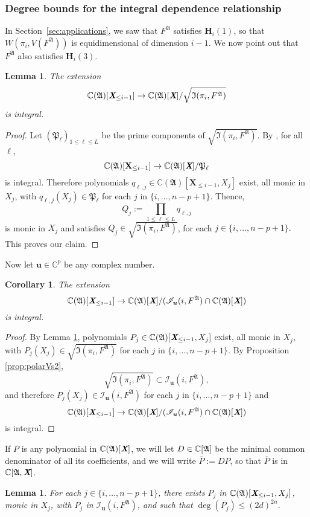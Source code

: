\documentclass[12pt]{article}
\def\fp{\mathfrak{P}}
\def\A{\mathfrak{A}}
\def\Xb{\textit{\textbf{X}}}
\def\ub{{\bm u}}
\def\pjb{\overline{P_{j}}}
\def\C{\mathbb{C}}
\def\WifA{W(\pi_i,V(F^{\A}))}
\def\IifAr{\sqrt{\mathfrak{I}(\pi_i,F^{\A})}}
\def\IifA{\mathfrak{I}(\pi_i,F^{\A})}
\def\IilfA{\mathscr{I}_{\ub}(i,F^{\A})}
\newtheorem{corollary}[theorem]{Corollary}
\newtheorem{lemma}[theorem]{Lemma}
\begin{document}
\subsubsection{Degree bounds for the integral dependence relationship} 
%
In Section~\ref{sec:applications}, we saw that
$F^\A$ satisfies $\bm H_i(1)$, so that $\WifA$ is equidimensional of dimension $i-1$. We
now point out that $F^\A$ also satisfies $\bm H_i(3)$.
\begin{lemma}\label{lem:6.1}
 The extension $$\C(\A)[\Xb_{\leq i-1}]\rightarrow
 \C(\A)[\Xb]/\IifAr$$ is integral.
\end{lemma}
%
\begin{proof}
  Let $(\fp_\ell)_{1 \le \ell \leq L}$ be the prime components of $\IifAr$. By \cite[Proposition 1]{EMP}, for all
  $\ell$,
  \[
    \C(\A)[\textbf{X}_{\leq i-1}]\rightarrow\C(\A)[\Xb]/\fp_\ell
  \] 
  is integral. Therefore polynomials
  $q_{\ell,j}\in\C(\A)[\textbf{X}_{\leq i-1},X_j]$ exist, all monic in
  $X_j$, with $q_{\ell,j}(X_j)\in \fp_\ell$ for each $j$ in
  $\{i,\hdots,n-p+1\}.$ Thence, \[Q_{j} := \prod_{1 \le \ell\le L}
  q_{\ell,j}\] is monic in $X_j$ and satisfies $ Q_{j} \in \sqrt{\IifA}$, for
  each $j \in \{i,\hdots,n-p+1\}.$ This proves our claim.
\end{proof}
%
\noindent 
Now let $\ub \in \C^p$ be any complex number. 
\begin{corollary}\label{lem:6.2}
 The extension $$\C(\A)[\Xb_{\leq i-1}]\rightarrow
 \C(\A)[\Xb]/(\IilfA \cap \C(\A)[\Xb])$$ is integral.
\end{corollary}
%
\begin{proof}
By Lemma \ref{lem:6.1}, polynomials
  $P_{j}\in\C(\A)[\Xb_{\leq i-1},X_j]$ exist, all monic in
  $X_j$, with $P_{j}(X_j)\in \IifAr$ for each $j$ in
  $\{i,\hdots,n-p+1\}.$ By Proposition \ref{prop:polarVs2}, 
  \[
  \sqrt{\IifA} \subset \IilfA,
  \]
  and therefore $P_{j}(X_j)\in \IilfA$ for each $j$ in 
  $\{i,\hdots,n-p+1\}$ and 
  \[
  \C(\A)[\Xb_{\leq i-1}]\rightarrow
 \C(\A)[\Xb]/(\IilfA \cap \C(\A)[\Xb])
  \]
 is integral.
\end{proof}
%
\noindent
If $P$ is any polynomial in $\C(\frak A)[\Xb]$, we will let
$D \in \C[\frak A]$ be the minimal common denominator of all its
coefficients, and we will write $\overline P := D P$, so that
$\overline P$ is in $\C[\A,\Xb]$.


    \begin{lemma} 
    For each $j \in \{i,\dots,n-p+1\}$, there exists $P_j$ in $
    \C(\A)[\Xb_{\leq i-1},X_j]$, monic in $X_j$, with $\pjb$ in
    $\IilfA$, and such that $\deg(\pjb)\leq (2d)^{2n}.$
    \end{lemma} 
\end{document}
